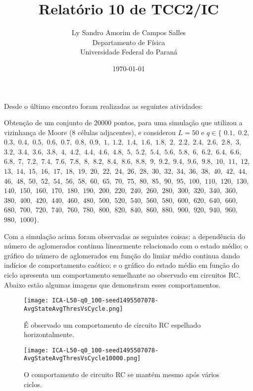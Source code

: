 \documentclass[12pt,a4paper,final]{article}
\title{Relatório 10 de TCC2/IC}
\author{Ly Sandro Amorim de Campos Salles\\Departamento de Física\\Universidade Federal do Paraná}
\date{\today}
\begin{document}
	\maketitle

  Desde o último encontro foram realizadas as seguintes atividades:

  Obtenção de um conjunto de 20000 pontos, para uma simulação que utilizou a vizinhança de Moore (8 células adjacentes), e considerou $L=50$ e $q\in\{$ 
  $0.1,$ $0.2,$ $0.3,$ $0.4,$ $0.5,$ $0.6,$ $0.7,$ $0.8,$ $0.9,$
  $1,$ $1.2,$ $1.4,$ $1.6,$ $1.8,$ 
  $2,$ $2.2,$ $2.4,$ $2.6,$ $2.8,$ 
  $3,$ $3.2,$ $3.4,$ $3.6,$ $3.8,$
  $4,$ $4.2,$ $4.4,$ $4.6,$ $4.8,$
  $5,$ $5.2,$ $5.4,$ $5.6,$ $5.8,$
  $6,$ $6.2,$ $6.4,$ $6.6,$ $6.8,$
  $7,$ $7.2,$ $7.4,$ $7.6,$ $7.8,$
  $8,$ $8.2,$ $8.4,$ $8.6,$ $8.8,$
  $9,$ $9.2,$ $9.4,$ $9.6,$ $9.8,$ $10,$
  $11,$ $12,$ $13,$ $14,$ $15,$ $16,$ $17,$ $18,$ $19,$ $20,$
  $22,$ $24,$ $26,$ $28,$ $30,$ $32,$ $34,$ $36,$ $38,$ $40,$
  $42,$ $44,$ $46,$ $48,$ $50,$ $52,$ $54,$ $56,$ $58,$ $60,$
  $65,$ $70,$ $75,$ $80,$ $85,$ $90,$ $95,$ $100,$ $110,$
  $120,$ $130,$ $140,$ $150,$ $160,$ $170,$ $180,$ $190,$
  $200,$ $220,$ $240,$ $260,$ $280,$ $300,$ $320,$ $340,$ $360,$ $380,$
  $400,$ $420,$ $440,$ $460,$ $480,$ $500,$ $520,$ $540,$ $560,$ $580,$
  $600,$ $620,$ $640,$ $660,$ $680,$ $700,$ $720,$ $740,$ $760,$ $780,$
  $800,$ $820,$ $840,$ $860,$ $880,$ $900,$ $920,$ $940,$ $960,$ $980,$
  $1000\}$. 

  Com a simulação acima foram observadas as seguintes coisas: a dependência do número de aglomerados continua linearmente relacionado com o estado médio; o gráfico do número de aglomerados em função do limiar médio continua dando indícios de comportamento caótico; e o gráfico do estado médio em função do ciclo apresenta um comportamento semelhante ao observado em circuitos RC. Abaixo estão algumas imagens que demonstram esses comportamentos.

  \begin{figure}[h]
    \centering
    \texttt{[image: ICA-L50-q0\_100-seed1495507078-AvgStateAvgThresVsCycle.png]}
    \caption{É observado um comportamento de circuito RC espelhado horizontalmente.}
  \end{figure}

  \begin{figure}[h]
    \centering
    \texttt{[image: ICA-L50-q0\_100-seed1495507078-AvgStateAvgThresVsCycle10000.png]}
    \caption{O comportamento de circuito RC se mantém mesmo após vários ciclos.}
  \end{figure}
\end{document}
